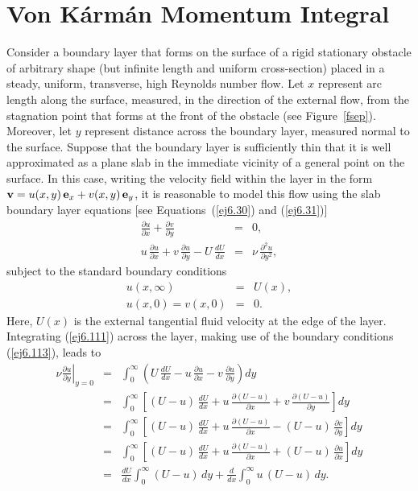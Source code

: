 \section{Von K\'{a}rm\'{a}n Momentum Integral}
Consider a  boundary layer that forms on the surface of a rigid stationary obstacle of arbitrary shape (but infinite length and
uniform cross-section) placed in a steady, uniform, transverse, high Reynolds
number flow. Let $x$ represent arc length along the surface, measured, in the direction of the external flow,  from the stagnation point that forms at the front of the obstacle (see Figure~\ref{fsep}). Moreover, let $y$ represent distance across the boundary layer, measured normal to the surface. Suppose that the boundary layer is
sufficiently thin that it is well approximated as a plane slab in the immediate vicinity of a general point on the
surface. In this case, writing the velocity field within the layer in the form ${\bf v} = u(x,y)\,{\bf e}_x+v(x,y)\,{\bf e}_y$, 
it is reasonable to model  this flow using the  slab boundary layer equations [see Equations~(\ref{ej6.30}) and (\ref{ej6.31})] 
\begin{eqnarray}
\frac{\partial u}{\partial x} + \frac{\partial v}{\partial y} &=&0,\label{ej6.110}\\[0.5ex]
u\,\frac{\partial u}{\partial x} + v\,\frac{\partial u}{\partial y} - U\,\frac{dU}{dx}& =& \nu\,\frac{\partial^2 u}{\partial y^2},\label{ej6.111}
\end{eqnarray}
subject to the standard boundary conditions
\begin{eqnarray}
u(x,\infty) &=& U(x),\label{ej6.112}\\[0.5ex]
u(x,0)=v(x,0) &=& 0.\label{ej6.113}
\end{eqnarray}
Here, $U(x)$ is the external tangential fluid velocity at the edge of the layer.  Integrating (\ref{ej6.111}) across the layer,
making use of the boundary conditions (\ref{ej6.113}), leads to
\begin{eqnarray}
\nu\left.\frac{\partial u}{\partial y}\right|_{y=0} &=&\int_0^\infty\left(U\,\frac{dU}{dx} - u\,\frac{\partial u}{\partial x}-v\,\frac{\partial u}{\partial y}\right)dy\nonumber\\[0.5ex]
&=&\int_0^\infty\left[(U-u)\,\frac{dU}{dx} + u\,\frac{\partial(U-u)}{\partial x} + v\,\frac{\partial(U-u)}{\partial y}\right]dy\nonumber\\[0.5ex]
&=&\int_0^\infty\left[(U-u)\,\frac{dU}{dx} + u\,\frac{\partial(U-u)}{\partial x} -(U-u)\,\frac{\partial v}{\partial y}\right]dy\nonumber\\[0.5ex]
&=&\int_0^\infty\left[(U-u)\,\frac{dU}{dx} + u\,\frac{\partial(U-u)}{\partial x} +(U-u)\,\frac{\partial u}{\partial x}\right]dy\nonumber\\[0.5ex]
&=& \frac{dU}{dx}\int_0^\infty (U-u)\,dy + \frac{d}{dx}\int_0^\infty u\,(U-u)\,dy.\label{ej6.114}
\end{eqnarray}
